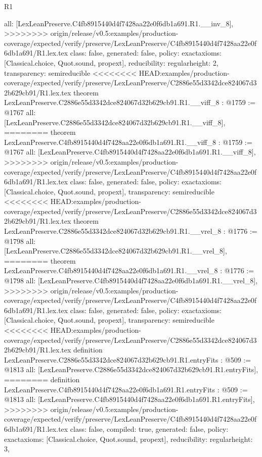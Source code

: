 \begin{lexlean}{R1}
\begin{coremodule}
{{{{{{{{{{{{  all: [LexLeanPreserve.C4fb8915440d4f7428aa22e0f6db1a691.R1.__inv_8],
>>>>>>>> origin/release/v0.5:examples/production-coverage/expected/verify/preserve/LexLeanPreserve/C4fb8915440d4f7428aa22e0f6db1a691/R1.lex.tex
  class: false,
  generated: false,
  policy: exact{axioms: [Classical.choice, Quot.sound, propext]},
  reducibility: regular{height: 2},
  transparency: semireducible
}
<<<<<<<< HEAD:examples/production-coverage/expected/verify/preserve/LexLeanPreserve/C2886e55d3342dce824067d32b629cb91/R1.lex.tex
theorem LexLeanPreserve.C2886e55d3342dce824067d32b629cb91.R1.__viff_8 : @1759 := @1767 {
  all: [LexLeanPreserve.C2886e55d3342dce824067d32b629cb91.R1.__viff_8],
========
theorem LexLeanPreserve.C4fb8915440d4f7428aa22e0f6db1a691.R1.__viff_8 : @1759 := @1767 {
  all: [LexLeanPreserve.C4fb8915440d4f7428aa22e0f6db1a691.R1.__viff_8],
>>>>>>>> origin/release/v0.5:examples/production-coverage/expected/verify/preserve/LexLeanPreserve/C4fb8915440d4f7428aa22e0f6db1a691/R1.lex.tex
  class: false,
  generated: false,
  policy: exact{axioms: [Classical.choice, Quot.sound, propext]},
  transparency: semireducible
}
<<<<<<<< HEAD:examples/production-coverage/expected/verify/preserve/LexLeanPreserve/C2886e55d3342dce824067d32b629cb91/R1.lex.tex
theorem LexLeanPreserve.C2886e55d3342dce824067d32b629cb91.R1.__vrel_8 : @1776 := @1798 {
  all: [LexLeanPreserve.C2886e55d3342dce824067d32b629cb91.R1.__vrel_8],
========
theorem LexLeanPreserve.C4fb8915440d4f7428aa22e0f6db1a691.R1.__vrel_8 : @1776 := @1798 {
  all: [LexLeanPreserve.C4fb8915440d4f7428aa22e0f6db1a691.R1.__vrel_8],
>>>>>>>> origin/release/v0.5:examples/production-coverage/expected/verify/preserve/LexLeanPreserve/C4fb8915440d4f7428aa22e0f6db1a691/R1.lex.tex
  class: false,
  generated: false,
  policy: exact{axioms: [Classical.choice, Quot.sound, propext]},
  transparency: semireducible
}
<<<<<<<< HEAD:examples/production-coverage/expected/verify/preserve/LexLeanPreserve/C2886e55d3342dce824067d32b629cb91/R1.lex.tex
definition LexLeanPreserve.C2886e55d3342dce824067d32b629cb91.R1.entryFits : @509 := @1813 {
  all: [LexLeanPreserve.C2886e55d3342dce824067d32b629cb91.R1.entryFits],
========
definition LexLeanPreserve.C4fb8915440d4f7428aa22e0f6db1a691.R1.entryFits : @509 := @1813 {
  all: [LexLeanPreserve.C4fb8915440d4f7428aa22e0f6db1a691.R1.entryFits],
>>>>>>>> origin/release/v0.5:examples/production-coverage/expected/verify/preserve/LexLeanPreserve/C4fb8915440d4f7428aa22e0f6db1a691/R1.lex.tex
  class: false,
  compiled: true,
  generated: false,
  policy: exact{axioms: [Classical.choice, Quot.sound, propext]},
  reducibility: regular{height: 3},
}}}}}}}}}}}}}}}
\end{coremodule}
\end{lexlean}
